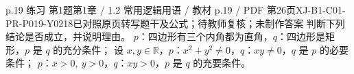 \par\noindent\begin{minipage}{\linewidth}
\begin{bankitem}{p.19 练习 第1题}{第1章 / 1.2 常用逻辑用语 / 教材 p.19 / PDF 第26页}{XJ-B1-C01-PR-P019-Y0218}{已对照原页转写题干及公式；待教师复核；未制作答案}
判断下列结论是否成立，并说明理由。
$p$：四边形有三个内角都为直角，$q$：四边形是矩形，$p$ 是 $q$ 的充分条件；
设 $x,y\in\mathbb R$，$p$：$x^2+y^2\ne0$，$q$：$xy\ne0$，$q$ 是 $p$ 的必要条件；
$p$：$x>0,\ y>0$，$q$：$xy>0$，$p$ 是 $q$ 的充要条件。
\end{bankitem}
\end{minipage}\par\medskip
